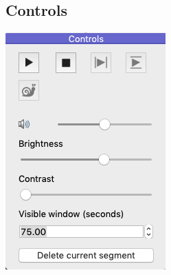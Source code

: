 \documentclass{article}
\begin{document}
\subsection{Controls \label{sec:play}}

\begin{center}
\includegraphics[width=.3\textwidth]{Figs/controls.png}
\end{center}
\end{document}
